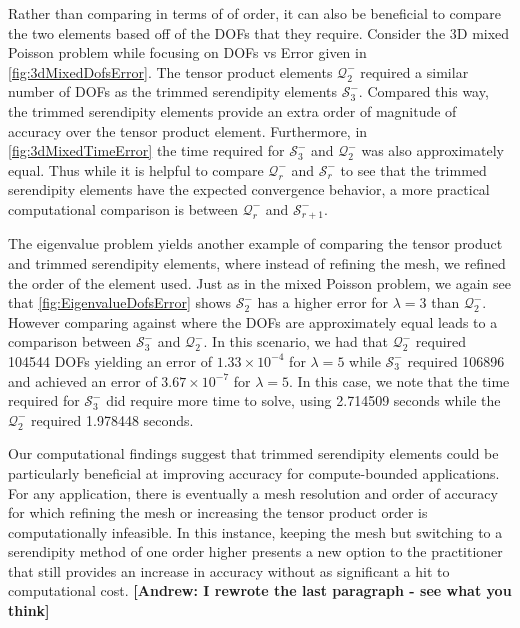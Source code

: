 \documentclass[format=acmsmall,screen,timestamp=false,a4paper]{acmart}
\newcommand\akg[1]{\textbf{\textcolor[rgb]{.5,0,1}{[Andrew: #1]}}}
\begin{document}
Rather than comparing in terms of of order, it can also be beneficial to compare the two elements based off of the DOFs that they require.  Consider the 3D mixed Poisson problem while focusing on DOFs vs Error given in \cref{fig:3dMixedDofsError}.  The tensor product elements $\mathcal{Q}^-_2$ required a similar number of DOFs as the trimmed serendipity elements $\mathcal{S}^-_3$.  Compared this way, the trimmed serendipity elements provide an extra order of magnitude of accuracy over the tensor product element.  Furthermore, in \cref{fig:3dMixedTimeError} the time required for $\mathcal{S}^-_3$ and $\mathcal{Q}^-_2$ was also approximately equal.   Thus while it is helpful to compare $\mathcal{Q}^-_r$ and $\mathcal{S}^-_r$ to see that the trimmed serendipity elements have the expected convergence behavior, a more practical computational comparison is between $\mathcal{Q}^-_r$ and $\mathcal{S}_{r+1}^-$.  

The eigenvalue problem yields another example of comparing the tensor product and trimmed serendipity elements, where instead of refining the mesh, we  refined the order of the element used.  Just as in the mixed Poisson problem, we again see that \cref{fig:EigenvalueDofsError} shows $\mathcal{S}^-_2$ has a higher error for $\lambda = 3$ than $\mathcal{Q}^-_2$.  However comparing against where the DOFs are approximately equal leads to a comparison between $\mathcal{S}^-_3$ and $\mathcal{Q}^-_2$.  In this scenario, we had that $\mathcal{Q}^-_2$ required 104544 DOFs yielding an error of $1.33 \times 10^{-4}$ for $\lambda = 5$ while $\mathcal{S}^-_3$ required 106896 and achieved an error of $3.67 \times 10^{-7}$ for $\lambda = 5$.  In this case, we note that the time required for $\mathcal{S}^-_3$ did require more time to solve, using 2.714509 seconds while the $\mathcal{Q}^-_2$ required 1.978448 seconds.


Our computational findings suggest that trimmed serendipity elements could be particularly beneficial at improving accuracy for compute-bounded applications.  For any application, there is eventually a mesh resolution and order of accuracy for which refining the mesh or increasing the tensor product order is computationally infeasible.  In this instance, keeping the mesh but switching to a serendipity method of one order higher presents a new option to the practitioner that still provides an increase in accuracy without as significant a hit to computational cost.
\akg{I rewrote the last paragraph - see what you think}
\end{document}
